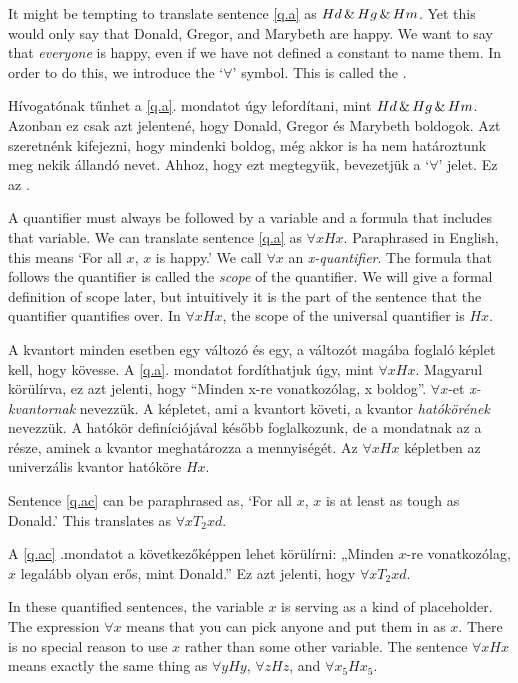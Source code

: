 It might be tempting to translate sentence \ref{q.a} as $Hd \,\&\, Hg \,\&\, Hm$. Yet this would only say that Donald, Gregor, and Marybeth are happy. We want to say that \emph{everyone} is happy, even if we have not defined a constant to name them. In order to do this, we introduce the `$\forall$' symbol. This is called the .

Hívogatónak tűnhet a \ref{q.a}. mondatot úgy lefordítani, mint $Hd \,\&\, Hg \,\&\, Hm$. Azonban ez csak azt jelentené, hogy Donald, Gregor és Marybeth boldogok. Azt szeretnénk kifejezni, hogy mindenki boldog, még akkor is ha nem határoztunk meg nekik állandó nevet. Ahhoz, hogy ezt megtegyük, bevezetjük a `$\forall$' jelet. Ez az .

A quantifier must always be followed by a variable and a formula that includes that variable. We can translate sentence \ref{q.a} as $\forall x Hx$. Paraphrased in English, this means `For all $x$, $x$ is happy.'
We call $\forall x$ an \emph{x-quantifier}. The formula that follows the quantifier is called the \emph{scope} of the quantifier. We will give a formal definition of scope later, but intuitively it is the part of the sentence that the quantifier quantifies over. In $\forall x Hx$, the scope of the universal quantifier is $Hx$.

A kvantort minden esetben egy változó és egy, a változót magába foglaló képlet kell, hogy kövesse. A \ref{q.a}. mondatot fordíthatjuk úgy, mint $\forall x Hx$. Magyarul körülírva, ez azt jelenti, hogy “Minden x-re vonatkozólag, x boldog”. $\forall x$-et \emph{x-kvantornak} nevezzük. A képletet, ami a kvantort követi, a kvantor \emph{hatókörének} nevezzük. A hatókör definíciójával később foglalkozunk, de a mondatnak az a része, aminek a kvantor meghatározza a mennyiségét. Az $\forall x Hx$ képletben az univerzális kvantor hatóköre $Hx$.

Sentence \ref{q.ac} can be paraphrased as, `For all $x$, $x$ is at least as tough as Donald.' This translates as $\forall x T_2xd$.

A \ref{q.ac} .mondatot a következőképpen lehet körülírni: „Minden $x$-re vonatkozólag, $x$ legalább olyan erős, mint Donald.” Ez azt jelenti, hogy $\forall x T_2xd$.

In these quantified sentences, the variable $x$ is serving as a kind of placeholder. The expression $\forall x$ means that you can pick anyone and put them in as $x$. There is no special reason to use $x$ rather than some other variable. The sentence $\forall x Hx$ means exactly the same thing as $\forall y Hy$, $\forall z Hz$, and $\forall x_5 Hx_5$.

